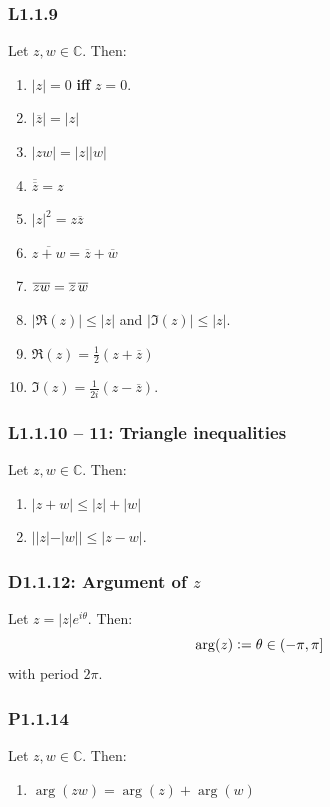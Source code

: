 \documentclass{article}
\newcommand{\deq}{\vcentcolon=}
\begin{document}
\begin{multicols*}{3}
\subsubsection*{L1.1.9}
Let $z,w\in\mathbb{C}$. Then:
\begin{enumerate}
    \item $|z|=0$ \textbf{if{}f} $z=0$.
    
    \item $|\overline{z}|=|z|$
    
    \item $|zw|=|z||w|$
    
    \item $\overline{\overline{z}}=z$
    
    \item $|z|^2=z\overline{z}$
    
    \item $\overline{z+w}=\overline{z}+\overline{w}$
    
    \item $\overline{zw}=\overline{z}\hspace{0.02in}\overline{w}$
    
    \item $|\Re(z)|\leq|z|$ and $|\Im(z)|\leq|z|$.
    
    \item $\Re(z)=\frac{1}{2}(z+\overline{z})$
    
    \item $\Im(z)=\frac{1}{2i}(z-\overline{z})$.
\end{enumerate}

\subsubsection*{L1.1.10 -- 11: Triangle inequalities}
Let $z,w\in\mathbb{C}$. Then:
\begin{enumerate}
    \item $|z+w|\leq|z|+|w|$
    
    \item $||z|-|w||\leq|z-w|$.
\end{enumerate}

\subsubsection*{D1.1.12: Argument of $z$}
Let $z=|z|e^{i\theta}$. Then:
$$\arg(z)\deq\theta\in(-\pi,\pi]$$
with period $2\pi$.

\subsubsection*{P1.1.14}
Let $z,w\in\mathbb{C}$. Then:
\begin{enumerate}
    \item $\arg(zw)=\arg(z)+\arg(w)$
    

\end{enumerate}
\end{multicols*}
\end{document}

